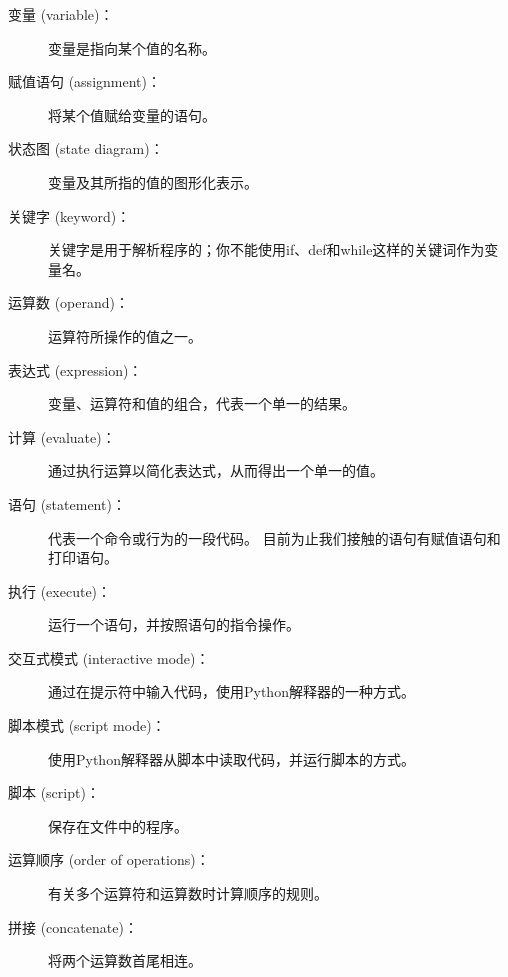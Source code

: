 \begin{description}

\item[变量 (variable)：]  变量是指向某个值的名称。
  

\item[赋值语句 (assignment)：]  将某个值赋给变量的语句。
  

\item[状态图 (state diagram)：]  变量及其所指的值的图形化表示。
  

\item[关键字 (keyword)：]  关键字是用于解析程序的；你不能使用if、def和while这样的关键词作为变量名。
  

\item[运算数 (operand)：]  运算符所操作的值之一。
  

\item[表达式 (expression)：]  变量、运算符和值的组合，代表一个单一的结果。
  

\item[计算 (evaluate)：]  通过执行运算以简化表达式，从而得出一个单一的值。

\item[语句 (statement)：]  代表一个命令或行为的一段代码。 目前为止我们接触的语句有赋值语句和打印语句。
  

\item[执行 (execute)：]  运行一个语句，并按照语句的指令操作。
  

\item[交互式模式 (interactive mode)：]  通过在提示符中输入代码，使用Python解释器的一种方式。
  

\item[脚本模式 (script mode)：]  使用Python解释器从脚本中读取代码，并运行脚本的方式。
  

\item[脚本 (script)：]  保存在文件中的程序。
  

\item[运算顺序 (order of operations)：]  有关多个运算符和运算数时计算顺序的规则。
  

\item[拼接 (concatenate)：]  将两个运算数首尾相连。
  


\end{description}
